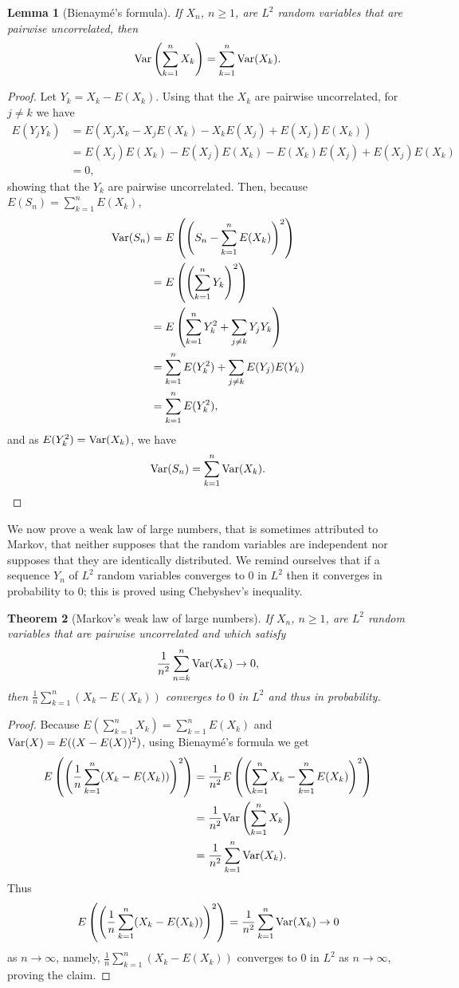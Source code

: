\documentclass{article}
\newcommand{\Var}{\ensuremath\mathrm{Var}}
\newtheorem{theorem}{Theorem}
\newtheorem{lemma}[theorem]{Lemma}
\theoremstyle{definition}
\begin{document}
\begin{lemma}[Bienaym\'e's formula]
If $X_n$, $n \geq 1$, are $L^2$ random variables that are pairwise uncorrelated, then
\[
\Var\left(\sum_{k=1}^n X_k \right) = \sum_{k=1}^n \Var(X_k).
\]
\label{bienayme}
\end{lemma}
\begin{proof}
Let $Y_k=X_k-E(X_k)$. 
Using that the $X_k$ are pairwise uncorrelated, for $j \neq k$ we have
\begin{align*}
E(Y_j Y_k)&=E(X_j X_k -X_jE(X_k)-X_kE(X_j)+E(X_j)E(X_k))\\
&=E(X_j) E(X_k) - E(X_j)E(X_k)-E(X_k)E(X_j)+E(X_j)E(X_k)\\
&=0,
\end{align*}
showing that the $Y_k$ are pairwise uncorrelated. Then, because $E(S_n)=\sum_{k=1}^n E(X_k)$,
\begin{align*}
\Var(S_n)&=E\left(\left(S_n - \sum_{k=1}^n E(X_k)\right)^2\right)\\
&=E\left(\left(\sum_{k=1}^n Y_k\right)^2\right)\\
&=E\left(\sum_{k=1}^n Y_k^2 + \sum_{j \neq k} Y_j Y_k\right)\\
&=\sum_{k=1}^n E(Y_k^2) + \sum_{j \neq k} E(Y_j) E(Y_k)\\
&=\sum_{k=1}^n E(Y_k^2),
\end{align*}
and as $E(Y_k^2) = \Var(X_k)$, we have
\[
\Var(S_n) = \sum_{k=1}^n \Var(X_k).
\]
\end{proof}

We now prove a weak law of large numbers, that is sometimes attributed to Markov,
that neither supposes that the random variables are independent nor
supposes that they are identically distributed. We remind ourselves that if a sequence $Y_n$ of $L^2$ random variables converges
to $0$ in $L^2$ then it converges in probability to $0$;
this is proved using Chebyshev's inequality.

\begin{theorem}[Markov's weak law of large numbers]
If $X_n$, $n \geq 1$, are $L^2$ random variables that are pairwise uncorrelated and  which satisfy
\[
\frac{1}{n^2} \sum_{n=k}^n \Var(X_k) \to 0,
\]
then $\frac{1}{n} \sum_{k=1}^n (X_k-E(X_k))$ converges to $0$ in $L^2$ and thus in probability.
\end{theorem}
\begin{proof}
Because $E\left( \sum_{k=1}^n X_k\right) =  \sum_{k=1}^n E(X_k)$
and $\Var(X)=E((X-E(X))^2)$,
using Bienaym\'e's formula we get
\begin{align*}
E\left( \left( \frac{1}{n} \sum_{k=1}^n (X_k-E(X_k)) \right)^2 \right)&=
\frac{1}{n^2} E\left(\left(\sum_{k=1}^n X_k - \sum_{k=1}^n E(X_k)\right)^2 \right)\\
&=\frac{1}{n^2} \Var\left( \sum_{k=1}^n X_k \right)\\
&=\frac{1}{n^2} \sum_{k=1}^n \Var(X_k).
\end{align*}
Thus
\[
E\left( \left( \frac{1}{n} \sum_{k=1}^n (X_k-E(X_k)) \right)^2 \right) = \frac{1}{n^2} \sum_{k=1}^n \Var(X_k) \to 0
\]
as $n \to \infty$, namely, $ \frac{1}{n} \sum_{k=1}^n (X_k-E(X_k))$ converges to $0$ in $L^2$ as $n \to \infty$, proving the claim.
\end{proof}
\end{document}
